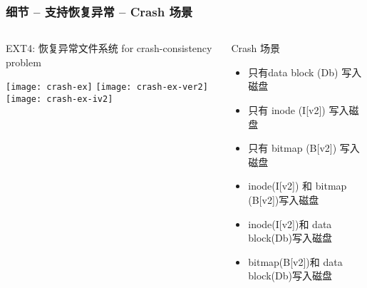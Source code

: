 \begin{frame}[fragile]
	\frametitle{细节 -- 支持恢复异常 -- Crash 场景}
	\begin{columns}
	\begin{column}{.4\textwidth}
	EXT4: 恢复异常文件系统 for crash-consistency problem
	
	\centering
	\texttt{[image: crash-ex]}
	\texttt{[image: crash-ex-ver2]}
	\texttt{[image: crash-ex-iv2]}	
	\end{column}
	\pause
	\begin{column}{.6\textwidth}			
			Crash 场景
			\begin{itemize}
				\item 只有data block (Db) 写入磁盘
				\item 只有 inode (I[v2])  写入磁盘
				\item 只有 bitmap (B[v2])  写入磁盘
				\pause
				\item inode(I[v2]) 和 bitmap (B[v2])写入磁盘
				\item inode(I[v2])和 data block(Db)写入磁盘
				\item bitmap(B[v2])和 data block(Db)写入磁盘
			\end{itemize}
			
		\end{column}
	\end{columns}
	
\end{frame}


